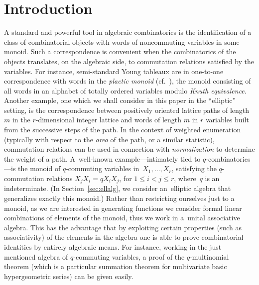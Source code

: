 \documentclass[pdftex]{sigma}
\numberwithin{equation}{section}
\theoremstyle{definition}
\begin{document}


\renewcommand{\thefootnote}{\arabic{footnote}}
\setcounter{footnote}{0}

\section{Introduction}\label{sec:intro}
A standard and powerful tool in algebraic combinatorics
is the identification of a class of combinatorial objects with
words of noncommuting variables in some monoid.
Such a correspondence is convenient when
the combinatorics of the objects translates, on the algebraic
side, to commutation relations satisfied by the variables.
For instance, semi-standard Young tableaux are in
one-to-one correspondence with words in the \textit{plactic monoid}
(cf.\ \cite{LS}), the monoid consisting of all words
in an alphabet of totally ordered variables modulo
\textit{Knuth equivalence}. Another example, one which we
shall consider in this paper in the ``elliptic'' setting, is the
correspondence between positively oriented lattice paths
of length $m$ in the $r$-dimensional integer lattice and words
of length $m$ in $r$ variables built from the successive
steps of the path. In the context of weighted enumeration
(typically with respect to the \textit{area} of the path,
or a similar statistic),
commutation relations can be used in connection with
\textit{normalization} to determine the weight of a path.
A~well-known example---intimately tied to
$q$-combinatorics---is the monoid of $q$-commuting
variables in~${X_1,\dots,X_r}$, satisfying the
$q$-commutation relations $X_jX_i=qX_iX_j$, for
$1\le i<j\le r$, where~$q$ is an indeterminate.
(In Section~\ref{sec:ellalg}, we consider an~elliptic
algebra that generalizes exactly this monoid.)
Rather than restricting ourselves just to a monoid,
as we are interested in generating functions
we consider formal linear combinations of
elements of the monoid, thus we work in a~unital
associative algebra. %
This has the advantage that by exploiting certain
properties (such as associativity) of the elements
in the algebra one is able to prove %
combinatorial identities
by entirely algebraic means.
For instance, working in the just mentioned
algebra of $q$-commuting variables,
a proof of the $q$-multinomial theorem
(which is a particular summation theorem for
multivariate basic hypergeometric series)
can be given easily.
\end{document}
